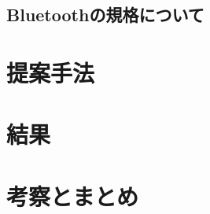 \documentclass[a4paper, 11pt]{ltjsarticle}
\begin{document}
\subsection{Bluetoothの規格について}

\clearpage
\section{提案手法}

\clearpage
\section{結果}

\clearpage
\section{考察とまとめ}

\clearpage
{}


\end{document}
